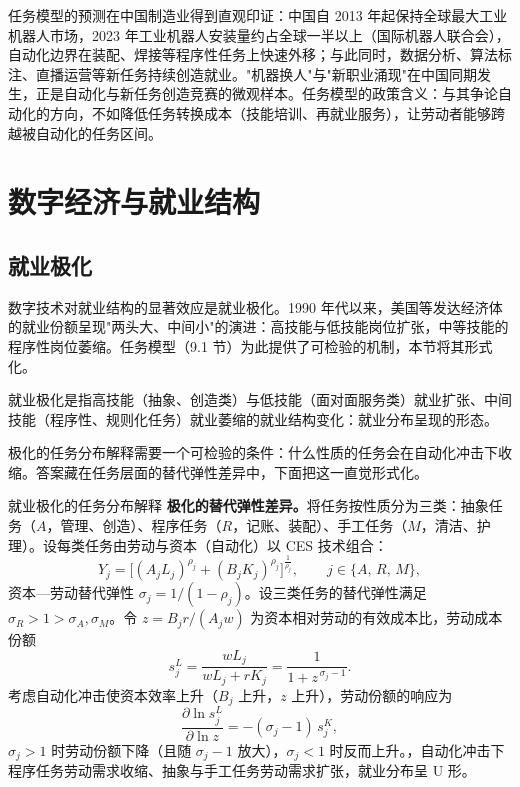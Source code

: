 任务模型的预测在中国制造业得到直观印证：中国自 2013 年起保持全球最大工业机器人市场，2023 年工业机器人安装量约占全球一半以上（国际机器人联合会），自动化边界在装配、焊接等程序性任务上快速外移；与此同时，数据分析、算法标注、直播运营等新任务持续创造就业。"机器换人"与"新职业涌现"在中国同期发生，正是自动化与新任务创造竞赛的微观样本。任务模型的政策含义：与其争论自动化的方向，不如降低任务转换成本（技能培训、再就业服务），让劳动者能够跨越被自动化的任务区间。

\section{数字经济与就业结构}

\subsection{就业极化}

数字技术对就业结构的显著效应是就业极化。1990 年代以来，美国等发达经济体的就业份额呈现"两头大、中间小"的演进：高技能与低技能岗位扩张，中等技能的程序性岗位萎缩。任务模型（9.1 节）为此提供了可检验的机制，本节将其形式化。

\begin{definition}
就业极化是指高技能（抽象、创造类）与低技能（面对面服务类）就业扩张、中间技能（程序性、规则化任务）就业萎缩的就业结构变化：就业分布呈现的形态。
\end{definition}

极化的任务分布解释需要一个可检验的条件：什么性质的任务会在自动化冲击下收缩。答案藏在任务层面的替代弹性差异中，下面把这一直觉形式化。

\begin{derivation}{就业极化的任务分布解释}{}
\textbf{极化的替代弹性差异。}将任务按性质分为三类：抽象任务（$A$，管理、创造）、程序任务（$R$，记账、装配）、手工任务（$M$，清洁、护理）。设每类任务由劳动与资本（自动化）以 CES 技术组合：
\[
Y_j = \bigl[(A_j L_j)^{\rho_j} + (B_j K_j)^{\rho_j}\bigr]^{\frac{1}{\rho_j}}, \qquad j \in \{A,\, R,\, M\},
\]
资本—劳动替代弹性 $\sigma_j = 1/(1-\rho_j)$。设三类任务的替代弹性满足 $\sigma_R > 1 > \sigma_A, \sigma_M$。令 $z = B_j r / (A_j w)$ 为资本相对劳动的有效成本比，劳动成本份额
\[
s_j^L = \frac{w L_j}{w L_j + r K_j} = \frac{1}{1 + z^{\,\sigma_j - 1}}.
\]
考虑自动化冲击使资本效率上升（$B_j$ 上升，$z$ 上升），劳动份额的响应为
\[
\frac{\partial \ln s_j^L}{\partial \ln z} = -(\sigma_j - 1)\, s_j^K,
\]
$\sigma_j > 1$ 时劳动份额下降（且随 $\sigma_j - 1$ 放大），$\sigma_j < 1$ 时反而上升。，自动化冲击下程序任务劳动需求收缩、抽象与手工任务劳动需求扩张，就业分布呈 U 形。
\end{derivation}

